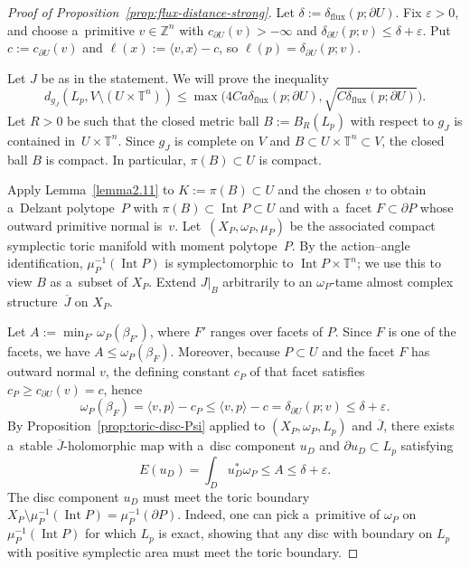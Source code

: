 \documentclass[10pt,a4paper]{amsart}
\numberwithin{equation}{section}
\newcommand{\bZ}{{\mathbb Z}}
\newcommand{\bT}{{\mathbb T}}
\theoremstyle{definition}
\begin{document}
\begin{proof}[Proof of Proposition~\ref{prop:flux-distance-strong}]
Let $\delta:=\delta_{\mathrm{flux}}(p;\partial U)$.
Fix $\varepsilon>0$, and choose a~primitive $v\in\bZ^n$ with $c_{\partial U}(v)>-\infty$ and $\delta_{\partial U}(p;v)\le \delta+\varepsilon$.
Put $c:=c_{\partial U}(v)$ and $\ell(x):=\langle v,x\rangle-c$, so $\ell(p)=\delta_{\partial U}(p;v)$.

Let $J$ be as in the statement. We will prove the inequality
\begin{equation}\label{eqPreciseVersion}
 d_{g_J}(L_p, V\setminus (U\times\bT^n)) \le \max\bigl(4Ca\delta_{\mathrm{flux}}(p;\partial U),\sqrt{C\delta_{\mathrm{flux}}(p;\partial U)}\bigr).
\end{equation}
Let $R>0$ be such that the closed metric ball $B:=B_R(L_p)$ with respect to $g_J$ is contained in~${U\times\bT^n}$.
Since $g_J$ is complete on $V$ and $B\subset U\times\bT^n\subset V$, the closed ball $B$ is compact. In particular, $\pi(B)\subset U$ is compact.

Apply Lemma~\ref{lemma2.11} to $K:=\pi(B)\subset U$ and the chosen $v$ to obtain a~Delzant polytope~$P$ with
$
\pi(B)\subset \operatorname{Int} P\subset U
$
and with a~facet $F\subset \partial P$ whose outward primitive normal is~$v$.
Let~${(X_P,\omega_P,\mu_P)}$ be the associated compact symplectic toric manifold with moment polytope~$P$.
By the action--angle identification, $\mu_P^{-1}(\operatorname{Int}P)$ is symplectomorphic to $\operatorname{Int}P\times\bT^n$; we use this to view $B$ as a~subset of $X_P$.
Extend $J|_{B}$ arbitrarily to an $\omega_P$-tame almost complex structure~$\overline{J}$ on $X_P$.

Let $A:=\min_{F'}\omega_P(\beta_{F'})$, where $F'$ ranges over facets of $P$.
Since $F$ is one of the facets, we have $A\le \omega_P(\beta_F)$.
Moreover, because $P\subset U$ and the facet $F$ has outward normal $v$, the defining constant $c_P$ of that facet satisfies $c_P\ge c_{\partial U}(v)=c$, hence
\[
\omega_P(\beta_F)=\langle v,p\rangle-c_P \le \langle v,p\rangle-c = \delta_{\partial U}(p;v) \le \delta+\varepsilon.
\]
By Proposition~\ref{prop:toric-disc-Psi} applied to $(X_P,\omega_P,L_p)$ and $\overline{J}$, there exists a~stable $\overline{J}$-holomorphic map with a~disc component $u_D$ and $\partial u_D\subset L_p$ satisfying
\[
E(u_D)=\int_D u_D^*\omega_P \le A \le \delta+\varepsilon.
\]
The disc component $u_D$ must meet the toric boundary
$
X_P\setminus \mu_P^{-1}(\operatorname{Int}P)=\mu_P^{-1}(\partial P)$.
Indeed, one can pick a~primitive of $\omega_P$ on $\mu_P^{-1}(\operatorname{Int}P)$ for which $L_p$ is exact, showing that any disc with boundary on $L_p$ with positive symplectic area must meet the toric boundary.


\end{proof}
\end{document}

